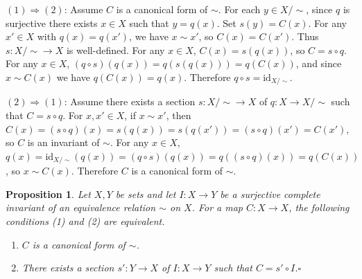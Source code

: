 \documentclass{article}
\makeatletter
\theoremstyle{noperiod}
\newtheorem{proposition}{Proposition}
\renewenvironment{proof}[1][\proofname]{\par
  \pushQED{\qed}
  \normalfont \topsep6\p@\@plus6\p@\relax
  \trivlist
  \item[\hskip\labelsep
        \itshape
    #1 ]\ignorespaces
}{
  \popQED\endtrivlist\@endpefalse
}
\renewcommand{\proofname}{\bfseries Proof}
\makeatother
\begin{document}
\begin{proof}
$(1) \Rightarrow (2)$:\; Assume $C$ is a canonical form of $\sim$. For each
$y \in X/\sim$, since $q$ is surjective there exists $x \in X$ such that
$y = q(x)$. Set $s(y) = C(x)$. For any $x' \in X$ with $q(x) = q(x')$, we
have $x \sim x'$, so $C(x) = C(x')$. Thus $s \colon X/\sim \to X$ is
well-defined. For any $x \in X$, $C(x) = s(q(x))$, so $C = s \circ q$. For
any $x \in X$, $(q \circ s)(q(x)) = q(s(q(x))) = q(C(x))$, and since
$x \sim C(x)$ we have $q(C(x)) = q(x)$. Therefore $q \circ s =
\mathrm{id}_{X/\sim}$.

$(2) \Rightarrow (1)$:\; Assume there exists a section $s \colon X/\sim \to X$
of $q \colon X \to X/\sim$ such that $C = s \circ q$. For $x, x' \in X$, if
$x \sim x'$, then $C(x) = (s \circ q)(x) = s(q(x)) = s(q(x')) = (s \circ q)(x')
= C(x')$, so $C$ is an invariant of $\sim$. For any $x \in X$,
$q(x) = \mathrm{id}_{X/\sim}(q(x)) = (q \circ s)(q(x)) = q((s \circ q)(x)) =
q(C(x))$, so $x \sim C(x)$. Therefore $C$ is a canonical form of $\sim$.
\end{proof}

\begin{proposition}
Let $X, Y$ be sets and let $I \colon X \to Y$ be a surjective complete invariant
of an equivalence relation $\sim$ on $X$. For a map $C \colon X \to X$, the
following conditions \textup{(1)} and \textup{(2)} are equivalent.
\def\labelenumi{(\theenumi)}
\begin{enumerate}
  \item $C$ is a canonical form of $\sim$.
  \item There exists a section $s' \colon Y \to X$ of $I \colon X \to Y$ such
        that $C = s' \circ I$.\hfill $\square$
\end{enumerate}
\end{proposition}
\end{document}
